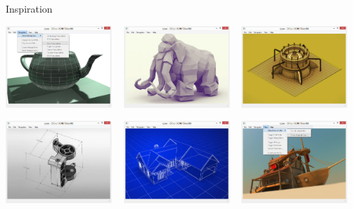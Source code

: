 \begin{frame}{Inspiration}

	\center

	\includegraphics[width=0.3\textwidth]{intro/mock_00}
	~
	\includegraphics[width=0.3\textwidth]{intro/mock_01}
	~
	\includegraphics[width=0.3\textwidth]{intro/mock_02}
		
	\medskip
	
	\includegraphics[width=0.3\textwidth]{intro/mock_05}
	~
	\includegraphics[width=0.3\textwidth]{intro/mock_03}
	~
	\includegraphics[width=0.3\textwidth]{intro/mock_04}
	
\end{frame}


